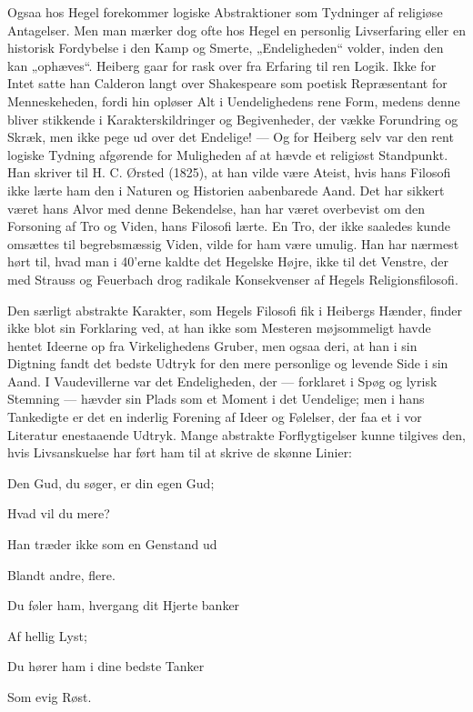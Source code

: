\documentclass[12pt,a4paper,openany]{book}
\newcommand{\opage}[1]{\marginnote{\footnotesize\textit{[#1]}}}
\begin{document}
Ogsaa hos Hegel forekommer logiske Abstraktioner som Tydninger af religiøse
Antagelser. Men man mærker dog ofte hos Hegel en personlig Livserfaring eller
en historisk Fordybelse i den Kamp og Smerte, „Endeligheden“ volder, inden den
kan „ophæves“. Heiberg gaar for rask over fra Erfaring til ren Logik. Ikke for
Intet satte han Calderon langt over Shakespeare som poetisk Repræsentant for
Menneskeheden, fordi hin opløser Alt i Uendelighedens rene Form, medens denne
bliver stikkende i Karakterskildringer og Begivenheder, der vække Forundring og
Skræk, men ikke pege ud over det Endelige! --- Og for Heiberg selv var den rent
logiske Tydning afgørende for Muligheden af at hævde et religiøst Standpunkt.
Han skriver til H. C. Ørsted (1825), at han vilde være Ateist, hvis hans
Filosofi ikke lærte ham
\setcounter{footnote}{0}%
\opage{136}den i Naturen og Historien aabenbarede Aand. Det har sikkert været
hans Alvor med denne Bekendelse, han har været overbevist om den Forsoning af
Tro og Viden, hans Filosofi lærte. En Tro, der ikke saaledes kunde omsættes til
begrebsmæssig Viden, vilde for ham være umulig. Han har nærmest hørt til, hvad
man i 40'erne kaldte det Hegelske Højre, ikke til det Venstre, der med Strauss
og Feuerbach drog radikale Konsekvenser af Hegels Religionsfilosofi.

Den særligt abstrakte Karakter, som Hegels Filosofi fik i Heibergs Hænder,
finder ikke blot sin Forklaring ved, at han ikke som Mesteren møjsommeligt
havde hentet Ideerne op fra Virkelighedens Gruber, men ogsaa deri, at han i sin
Digtning fandt det bedste Udtryk for den mere personlige og levende Side i sin
Aand. I Vaudevillerne var det Endeligheden, der --- forklaret i Spøg og lyrisk
Stemning --- hævder sin Plads som et Moment i det Uendelige; men i hans
Tankedigte er det en inderlig Forening af Ideer og Følelser, der faa et i vor
Literatur enestaaende Udtryk. Mange abstrakte Forflygtigelser kunne tilgives
den, hvis Livsanskuelse har ført ham til at skrive de skønne Linier:

Den Gud, du søger, er din egen Gud;

Hvad vil du mere?

Han træder ikke som en Genstand ud

Blandt andre, flere.

Du føler ham, hvergang dit Hjerte banker

Af hellig Lyst;

Du hører ham i dine bedste Tanker

Som evig Røst.
\end{document}
